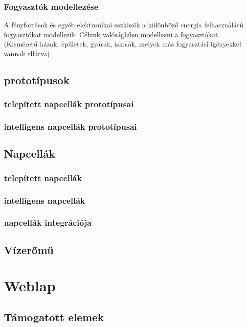 \documentclass[
]{thesis-ekf}
\theoremstyle{definition}
\theoremstyle{remark}
\begin{document}
		\subsection{Fogyasztók modellezése}
			\par A fényforrások és egyéb elektronikai eszközök a különböző energia felhasználású fogyasztókat modellezik. Célunk valósághűen modellezni a fogyasztókat. (Kisméretű házak, épületek, gyárak, iskolák, melyek más fogyasztási igényekkel vannak ellátva)
			
	\section{prototípusok}
		\subsection{telepített napcellák prototípusai}
		\subsection{intelligens napcellák prototípusai}
 	\section{Napcellák}
 		\subsection{telepített napcellák}
 		\subsection{intelligens napcellák}
 		\subsection{napcellák integrációja}
 	\section{Vízerőmű}
 	
 	

	
	
		

\chapter{Weblap}
	\section{Támogatott elemek}
\end{document}
